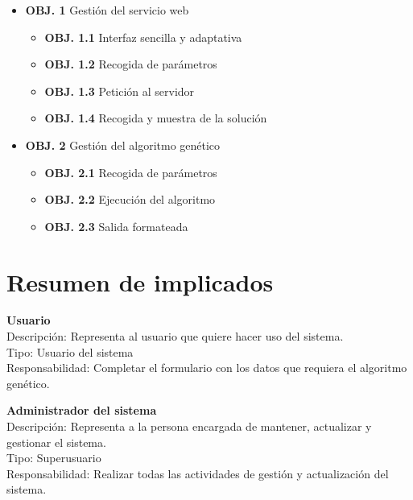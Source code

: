 \begin{itemize}
	\item  \textbf{OBJ. 1} Gestión del servicio web
	\begin{itemize}
		\item \textbf{OBJ. 1.1} Interfaz sencilla y adaptativa
		\item \textbf{OBJ. 1.2} Recogida de parámetros
		\item \textbf{OBJ. 1.3} Petición al servidor
		\item \textbf{OBJ. 1.4} Recogida y muestra de la solución
	\end{itemize}
		
	\item  \textbf{OBJ. 2} Gestión del algoritmo genético
	\begin{itemize}
		\item \textbf{OBJ. 2.1} Recogida de parámetros
		\item \textbf{OBJ. 2.2} Ejecución del algoritmo
		\item \textbf{OBJ. 2.3} Salida formateada
	\end{itemize}
	
\end{itemize}


	 

\newpage
\section{Resumen de implicados}

\bigskip
\textbf{Usuario}\\

Descripción: Representa al usuario que quiere hacer uso del sistema.\\

Tipo: Usuario del sistema\\

Responsabilidad: Completar el formulario con los datos que requiera el algoritmo genético.

\bigskip
\textbf{Administrador del sistema}\\

Descripción: Representa a la persona encargada de mantener, actualizar y gestionar el sistema.\\

Tipo: Superusuario\\

Responsabilidad: Realizar todas las actividades de gestión y actualización del sistema.



